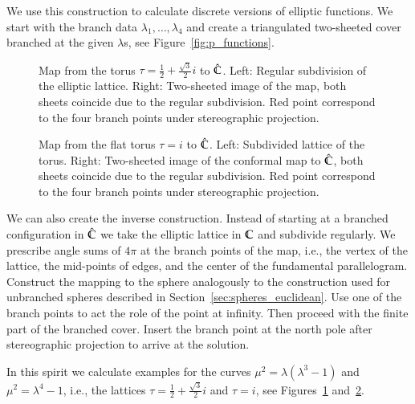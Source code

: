 \documentclass[Thesis]{subfiles}
\begin{document}
We use this construction to calculate discrete versions of elliptic functions.
We start with the branch data $\lambda_1,\ldots,\lambda_{4}$ and create a triangulated two-sheeted cover branched at the given $\lambda$s, see Figure~\ref{fig:p_functions}.


\begin{figure}
\centering
{}
\caption{
Map from the torus $\tau=\frac{1}{2}+\frac{\sqrt 3}{2}i$ to $\hat{\mathbb C}$. 
Left: Regular subdivision of the elliptic lattice. 
Right: Two-sheeted image of the map, both sheets coincide due to the regular subdivision. 
Red point correspond to the four branch points under stereographic projection.
} 
\label{fig:wente_elliptic}
\end{figure}

\begin{figure}
\centering
{}
\caption{
Map from the flat torus $\tau=i$ to $\hat{\mathbb C}$. 
Left: Subdivided lattice of the torus. 
Right: Two-sheeted image of the conformal map to $\hat{\mathbb C}$, both sheets coincide due to the regular subdivision. 
Red point correspond to the four branch points under stereographic projection.
}
\label{fig:square_elliptic} 
\end{figure}

We can also create the inverse construction. 
Instead of starting at a branched configuration in $\hat {\mathbb C}$ we take the elliptic lattice in $\mathbb C$ and subdivide regularly.
We prescribe angle sums of $4\pi$ at the branch points of the map, i.e., the vertex of the lattice, the mid-points of edges, and the center of the fundamental parallelogram.
Construct the mapping to the sphere analogously to the construction used for unbranched spheres described in Section~\ref{sec:spheres_euclidean}.
Use one of the branch points to act the role of the point at infinity.
Then proceed with the finite part of the branched cover.
Insert the branch point at the north pole after stereographic projection to arrive at the solution.

In this spirit we calculate examples for the curves $\mu^2=\lambda(\lambda^3-1)$ and $\mu^2=\lambda^4-1$, i.e., the lattices $\tau=\frac{1}{2}+\frac{\sqrt 3}{2}i$ and $\tau=i$, see Figures~\ref{fig:wente_elliptic} and~\ref{fig:square_elliptic}.
\end{document}

